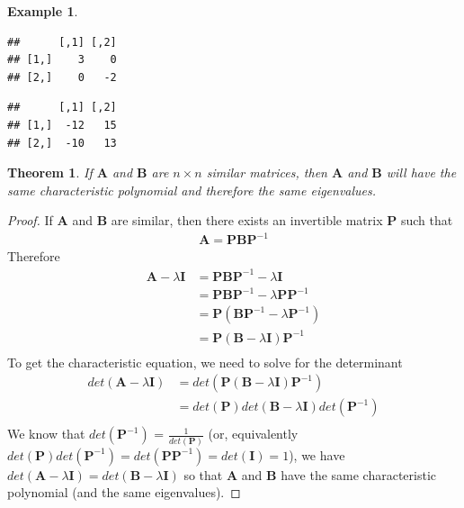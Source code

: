 \documentclass[
]{book}
\newenvironment{Shaded}{\begin{snugshade}}{\end{snugshade}}
\newcommand{\KeywordTok}[1]{\textcolor[rgb]{0.13,0.29,0.53}{\textbf{#1}}}
\newcommand{\NormalTok}[1]{#1}
\newcommand{\OperatorTok}[1]{\textcolor[rgb]{0.81,0.36,0.00}{\textbf{#1}}}
\newcommand{\StringTok}[1]{\textcolor[rgb]{0.31,0.60,0.02}{#1}}
\newtheorem{theorem}{Theorem}[chapter]
\theoremstyle{definition}
\theoremstyle{definition}
\newtheorem{example}{Example}[chapter]
\theoremstyle{definition}
\theoremstyle{definition}
\theoremstyle{remark}
\begin{document}
\begin{example}
\begin{verbatim}
##      [,1] [,2]
## [1,]    3    0
## [2,]    0   -2
\end{verbatim}

\begin{Shaded}
\end{Shaded}

\begin{verbatim}
##      [,1] [,2]
## [1,]  -12   15
## [2,]  -10   13
\end{verbatim}

\end{example}

\begin{theorem}
If \(\mathbf{A}\) and \(\mathbf{B}\) are \(n \times n\) similar matrices, then \(\mathbf{A}\) and \(\mathbf{B}\) will have the same characteristic polynomial and therefore the same eigenvalues.
\end{theorem}

\begin{proof}
If \(\mathbf{A}\) and \(\mathbf{B}\) are similar, then there exists an invertible matrix \(\mathbf{P}\) such that
\[
\begin{aligned}
\mathbf{A} = \mathbf{P} \mathbf{B} \mathbf{P}^{-1}
\end{aligned}
\]
Therefore
\[
\begin{aligned}
\mathbf{A}  - \lambda \mathbf{I} & = \mathbf{P} \mathbf{B} \mathbf{P}^{-1} - \lambda \mathbf{I} \\
& = \mathbf{P} \mathbf{B} \mathbf{P}^{-1} - \lambda \mathbf{P} \mathbf{P}^{-1} \\
& =  \mathbf{P} \left( \mathbf{B} \mathbf{P}^{-1} - \lambda \mathbf{P}^{-1} \right) \\
& =  \mathbf{P} \left( \mathbf{B} - \lambda \mathbf{I} \right) \mathbf{P}^{-1}\\
\end{aligned}
\]
To get the characteristic equation, we need to solve for the determinant
\[
\begin{aligned}
det\left( \mathbf{A}  - \lambda \mathbf{I} \right) & = det\left( \mathbf{P} \left( \mathbf{B} - \lambda \mathbf{I} \right) \mathbf{P}^{-1} \right) \\
& = det\left( \mathbf{P} \right)  det\left( \mathbf{B} - \lambda \mathbf{I} \right) det\left(\mathbf{P}^{-1} \right) \\
\end{aligned}
\]
We know that \(det\left(\mathbf{P}^{-1} \right)\) = \(\frac{1}{det\left(\mathbf{P} \right)}\) (or, equivalently \(det\left(\mathbf{P} \right) det\left(\mathbf{P}^{-1} \right) = det\left(\mathbf{P} \mathbf{P}^{-1} \right) = det(\mathbf{I}) = 1\)), we have \(det\left( \mathbf{A} - \lambda \mathbf{I} \right) = det\left( \mathbf{B} - \lambda \mathbf{I} \right)\) so that \(\mathbf{A}\) and \(\mathbf{B}\) have the same characteristic polynomial (and the same eigenvalues).
\end{proof}
\end{document}
